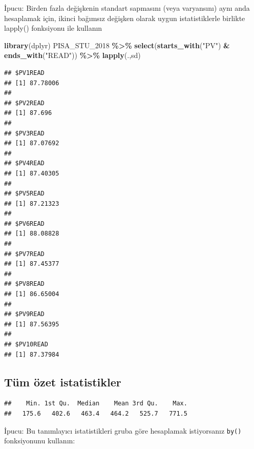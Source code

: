 \documentclass[
  oneside]{book}
\newenvironment{Shaded}{\begin{snugshade}}{\end{snugshade}}
\newcommand{\FunctionTok}[1]{\textcolor[rgb]{0.13,0.29,0.53}{\textbf{#1}}}
\newcommand{\NormalTok}[1]{#1}
\newcommand{\SpecialCharTok}[1]{\textcolor[rgb]{0.81,0.36,0.00}{\textbf{#1}}}
\newcommand{\StringTok}[1]{\textcolor[rgb]{0.31,0.60,0.02}{#1}}
\begin{document}
\begin{info}
İpucu: Birden fazla değişkenin standart sapmasını (veya varyansını) aynı anda hesaplamak için, ikinci bağımsız değişken olarak uygun istatistiklerle birlikte lapply() fonksiyonu ile kullanın

\end{info}

\begin{Shaded}
\begin{Highlighting}[]
\FunctionTok{library}\NormalTok{(dplyr)}
\NormalTok{PISA\_STU\_2018 }\SpecialCharTok{\%\textgreater{}\%} 
  \FunctionTok{select}\NormalTok{(}\FunctionTok{starts\_with}\NormalTok{(}\StringTok{"PV"}\NormalTok{) }\SpecialCharTok{\&} \FunctionTok{ends\_with}\NormalTok{(}\StringTok{"READ"}\NormalTok{)) }\SpecialCharTok{\%\textgreater{}\%}
  \FunctionTok{lapply}\NormalTok{(.,sd)}
\end{Highlighting}
\end{Shaded}

\begin{verbatim}
## $PV1READ
## [1] 87.78006
## 
## $PV2READ
## [1] 87.696
## 
## $PV3READ
## [1] 87.07692
## 
## $PV4READ
## [1] 87.40305
## 
## $PV5READ
## [1] 87.21323
## 
## $PV6READ
## [1] 88.08828
## 
## $PV7READ
## [1] 87.45377
## 
## $PV8READ
## [1] 86.65004
## 
## $PV9READ
## [1] 87.56395
## 
## $PV10READ
## [1] 87.37984
\end{verbatim}

\hypertarget{tuxfcm-uxf6zet-istatistikler}{%
\subsection{Tüm özet istatistikler}\label{tuxfcm-uxf6zet-istatistikler}}

\begin{Shaded}
\end{Shaded}

\begin{verbatim}
##    Min. 1st Qu.  Median    Mean 3rd Qu.    Max. 
##   175.6   402.6   463.4   464.2   525.7   771.5
\end{verbatim}

\begin{info}
İpucu: Bu tanımlayıcı istatistikleri gruba göre hesaplamak istiyorsanız \texttt{by()} fonksiyonunu kullanın:

\end{info}
\end{document}
